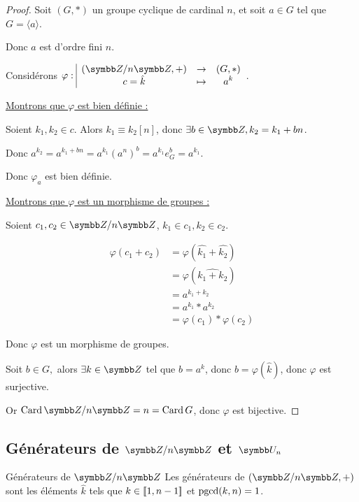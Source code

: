 \begin{proof}
    Soit $(G, \ast)$ un groupe cyclique de cardinal $n$, et soit $a \in G$ tel que $G = \langle a \rangle$.

    Donc $a$ est d'ordre fini $n$.

    Considérons $\fonction{\varphi}{(\Z/n\Z, +)}{(G, \ast)}{c = \hat k}{a^k}$.

    \uline{Montrons que $\varphi$ est bien définie :}

    \svspace Soient $k_1, k_2 \in c$. Alors $k_1 \equiv k_2 [n]$, donc $\exists b \in \Z, k_2 = k_1 + bn$.
    
    Donc $a^{k_2} = a^{k_1 + bn} = a^{k_1} (a^n)^b = a^{k_1} e_G^b = a^{k_1}$.

    Donc $\varphi_a$ est bien définie.

    \uline{Montrons que $\varphi$ est un morphisme de groupes :}

    \svspace Soient $c_1, c_2 \in \Z/n\Z$, $k_1 \in c_1, k_2 \in c_2$.

    \begin{align*}
        \varphi(c_1 + c_2) & = \varphi(\hat{k_1} + \hat{k_2}) \\
        & = \varphi(\widehat{k_1 + k_2}) \\
        & = a^{k_1 + k_2} \\
        & = a^{k_1} \ast a^{k_2} \\
        & = \varphi(c_1) \ast \varphi(c_2)
    \end{align*}

    Donc $\varphi$ est un morphisme de groupes.

    Soit $b \in G, $ alors $\exists k \in \Z$ tel que $b = a^k$, donc $b = \varphi(\hat k)$, donc $\varphi$ est surjective.

    Or $\operatorname{Card} \Z/n\Z = n = \operatorname{Card} G$, donc $\varphi$ est bijective.
\end{proof}

\subsection{Générateurs de \texorpdfstring{$\Z / n \Z$}{Z/nZ} et \texorpdfstring{$\symbb U_n$}{Un}}

\begin{theoreme}{Générateurs de $\Z/n\Z$}{}
    Les générateurs de $(\Z/n\Z, +)$ sont les éléments $\hat k$ tels que 
    $k \in [\![1, n-1]\!]$ et $\operatorname{pgcd}(k, n) = 1$.
\end{theoreme}

